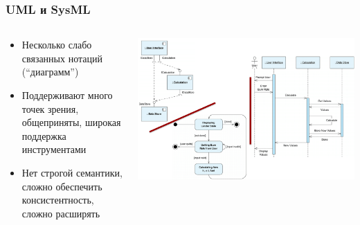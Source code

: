 \documentclass{../../slides-style}
\begin{document}
    \begin{frame}
        \frametitle{UML и SysML}
        \begin{columns}
            \begin{column}{0.4\textwidth}
                \begin{small}
                    \begin{itemize}
                        \item Несколько слабо связанных нотаций (``диаграмм'')
                        \item Поддерживают много точек зрения, общеприняты, широкая поддержка инструментами
                        \item Нет строгой семантики, сложно обеспечить консистентность, сложно расширять
                    \end{itemize}
                \end{small}
            \end{column}
            \begin{column}{0.6\textwidth}
                \begin{center}
                    \includegraphics[width=\textwidth]{uml.png}
                \end{center}
            \end{column}
        \end{columns}
    \end{frame}
\end{document}
